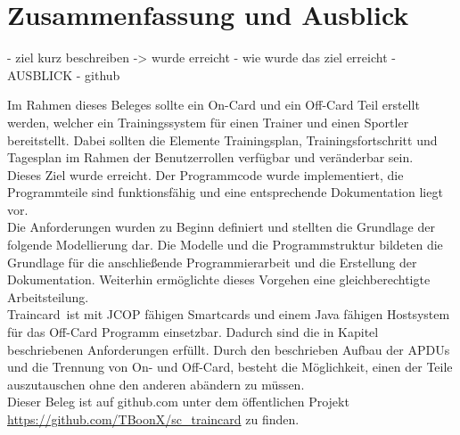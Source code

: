 \clearpage
\section{Zusammenfassung und Ausblick}
\label{sec:4}

- ziel kurz beschreiben -> wurde erreicht
- wie wurde das ziel erreicht
- AUSBLICK
- github

Im Rahmen dieses Beleges sollte ein On-Card und ein Off-Card Teil erstellt werden, welcher ein Trainingssystem für einen Trainer und einen Sportler bereitstellt.
Dabei sollten die Elemente Trainingsplan, Trainingsfortschritt und Tagesplan im Rahmen der Benutzerrollen verfügbar und veränderbar sein.
\\
Dieses Ziel wurde erreicht. Der Programmcode wurde implementiert, die Programmteile sind funktionsfähig und eine entsprechende Dokumentation liegt vor.
\\
Die Anforderungen wurden zu Beginn definiert und stellten die Grundlage der folgende Modellierung dar.
Die Modelle und die Programmstruktur bildeten die Grundlage für die anschließende Programmierarbeit und die Erstellung der Dokumentation.
Weiterhin ermöglichte dieses Vorgehen eine gleichberechtigte Arbeitsteilung.
\\

\glqq Traincard\grqq \ ist mit JCOP fähigen Smartcards und einem Java fähigen Hostsystem für das Off-Card Programm einsetzbar.
Dadurch sind die in Kapitel  beschriebenen Anforderungen erfüllt.
Durch den beschrieben Aufbau der APDUs und die Trennung von On- und Off-Card, besteht die Möglichkeit, einen der Teile auszutauschen ohne den anderen abändern zu müssen.
\\

Dieser Beleg ist auf github.com unter dem öffentlichen Projekt \url{https://github.com/TBoonX/sc_traincard} zu finden.
